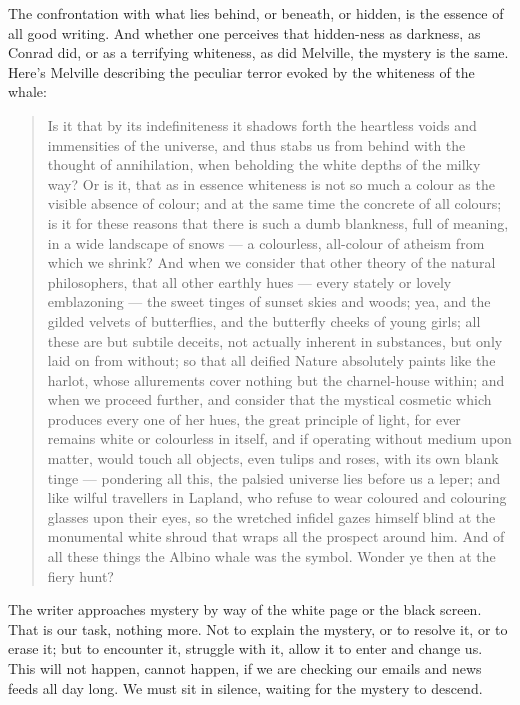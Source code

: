 \documentclass[letterpaper,10pt,headsepline]{scrreprt}
\begin{document}
The confrontation with what lies behind, or beneath, or hidden, is the
essence of all good writing. And whether one perceives that
hidden-ness as darkness, as Conrad did, or as a terrifying whiteness,
as did Melville, the mystery is the same. Here's Melville describing
the peculiar terror evoked by the whiteness of the whale:
\begin{quotation}
  Is it that by its indefiniteness it shadows forth the heartless
  voids and immensities of the universe, and thus stabs us from behind
  with the thought of annihilation, when beholding the white depths of
  the milky way? Or is it, that as in essence whiteness is not so much
  a colour as the visible absence of colour; and at the same time the
  concrete of all colours; is it for these reasons that there is such
  a dumb blankness, full of meaning, in a wide landscape of snows ---
  a colourless, all-colour of atheism from which we shrink? And when
  we consider that other theory of the natural philosophers, that all
  other earthly hues --- every stately or lovely emblazoning --- the
  sweet tinges of sunset skies and woods; yea, and the gilded velvets
  of butterflies, and the butterfly cheeks of young girls; all these
  are but subtile deceits, not actually inherent in substances, but
  only laid on from without; so that all deified Nature absolutely
  paints like the harlot, whose allurements cover nothing but the
  charnel-house within; and when we proceed further, and consider that
  the mystical cosmetic which produces every one of her hues, the
  great principle of light, for ever remains white or colourless in
  itself, and if operating without medium upon matter, would touch all
  objects, even tulips and roses, with its own blank tinge ---
  pondering all this, the palsied universe lies before us a leper; and
  like wilful travellers in Lapland, who refuse to wear coloured and
  colouring glasses upon their eyes, so the wretched infidel gazes
  himself blind at the monumental white shroud that wraps all the
  prospect around him. And of all these things the Albino whale was
  the symbol. Wonder ye then at the fiery hunt?
\end{quotation}

The writer approaches mystery by way of the white page or the black
screen. That is our task, nothing more. Not to explain the mystery, or
to resolve it, or to erase it; but to encounter it, struggle with it,
allow it to enter and change us. This will not happen, cannot happen,
if we are checking our emails and news feeds all day long. We must sit
in silence, waiting for the mystery to descend.
\end{document}
